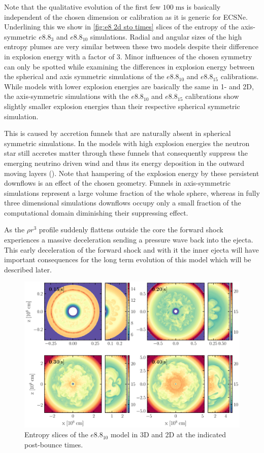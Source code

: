 \documentclass[fleqn,usenatbib]{mnras}
\begin{document}
Note that the qualitative evolution of the first few $100\;\mathrm{ms}$ is basically independent of the chosen dimension or calibration as it is generic for ECSNe. Underlining this we show in \autoref{fig:e8 2d sto times} slices of the entropy of the axis-symmetric $e8.8_{3}$ and $e8.8_{10}$ simulations. Radial and angular sizes of the high entropy plumes are very similar between these two models despite their difference in explosion energy with a factor of 3. 
Minor influences of the chosen symmetry can only be spotted while examining the differences in explosion energy between the spherical and axis symmetric simulations of the $e8.8_{10}$ and $e8.8_{15}$ calibrations. While models with lower explosion energies are basically the same in 1- and 2D, the axis-symmetric simulations with the $e8.8_{10}$ and $e8.8_{15}$ calibrations show slightly smaller explosion energies than their respective spherical symmetric simulation.

This is caused by accretion funnels that are naturally absent in spherical symmetric simulations. 
In the models with high explosion energies the neutron star still accretes matter through these funnels that consequently suppress the emerging neutrino driven wind and thus its energy deposition in the outward moving layers (\cite{Muellera}). Note that hampering of the explosion energy by these persistent downflows is an effect of the chosen geometry. Funnels in axis-symmetric simulations represent a large volume fraction of the whole sphere, whereas in fully three dimensional simulations downflows occupy only a small fraction of the computational domain diminishing their suppressing effect.

As the $\rho r^3$ profile suddenly flattens outside the core the forward shock experiences a massive deceleration sending a pressure wave back into the ejecta. This early deceleration of the forward shock and with it the inner ejecta will have important consequences for the long term evolution of this model which will be described later.

\begin{figure}
 \includegraphics[width=\textwidth]{pic/e8_10_2d3d_sto_cuts_4times.pdf}
 \caption{Entropy slices of the $e8.8_{10}$ model in 3D and 2D at the indicated post-bounce times. }
 \label{fig:e8 sto 4 times}
\end{figure}
\end{document}
